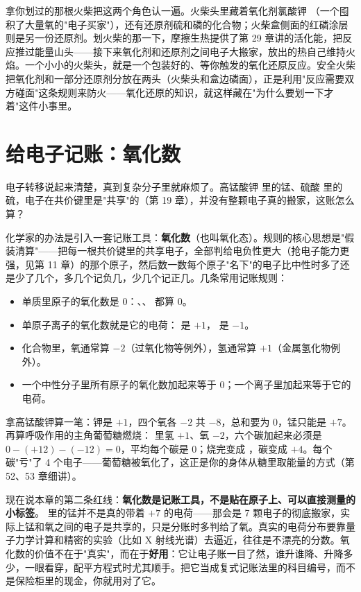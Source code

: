 拿你划过的那根火柴把这两个角色认一遍。火柴头里藏着氧化剂氯酸钾 （一个囤积了大量氧的"电子买家"），还有还原剂硫和磷的化合物；火柴盒侧面的红磷涂层则是另一份还原剂。划火柴的那一下，摩擦生热提供了第 29 章讲的活化能，把反应推过能量山头——接下来氧化剂和还原剂之间电子大搬家，放出的热自己维持火焰。一个小小的火柴头，就是一个包装好的、等你触发的氧化还原反应。安全火柴把氧化剂和一部分还原剂分放在两头（火柴头和盒边磷面），正是利用"反应需要双方碰面"这条规则来防火——氧化还原的知识，就这样藏在"为什么要划一下才着"这件小事里。

\section{给电子记账：氧化数}

电子转移说起来清楚，真到复杂分子里就麻烦了。高锰酸钾  里的锰、硫酸  里的硫，电子在共价键里是"共享"的（第 19 章），并没有整颗电子真的搬家，这账怎么算？

化学家的办法是引入一套记账工具：\textbf{氧化数}（也叫氧化态）。规则的核心思想是"假装清算"——把每一根共价键里的共享电子，全部判给电负性更大（抢电子能力更强，见第 11 章）的那个原子，然后数一数每个原子"名下"的电子比中性时多了还是少了几个，多几个记负几，少几个记正几。几条常用记账规则：

\begin{itemize}[itemsep=2pt]
\item 单质里原子的氧化数是 0：、、 都算 0。
\item 单原子离子的氧化数就是它的电荷： 是 $+1$， 是 $-1$。
\item 化合物里，氧通常算 $-2$（过氧化物等例外），氢通常算 $+1$（金属氢化物例外）。
\item 一个中性分子里所有原子的氧化数加起来等于 0；一个离子里加起来等于它的电荷。
\end{itemize}

拿高锰酸钾算一笔：钾是 $+1$，四个氧各 $-2$ 共 $-8$，总和要为 0，锰只能是 $+7$。再算呼吸作用的主角葡萄糖燃烧： 里氢 $+1$、氧 $-2$，六个碳加起来必须是 $0-(+12)-(-12)=0$，平均每个碳是 0；烧完变成 ，碳变成 $+4$。每个碳"亏"了 4 个电子——葡萄糖被氧化了，这正是你的身体从糖里取能量的方式（第 52、53 章细讲）。

现在说本章的第二条红线：\textbf{氧化数是记账工具，不是贴在原子上、可以直接测量的小标签}。 里的锰并不是真的带着 $+7$ 的电荷——那会是 7 颗电子的彻底搬家，实际上锰和氧之间的电子是共享的，只是分账时多判给了氧。真实的电荷分布要靠量子力学计算和精密的实验（比如 X 射线光谱）去逼近，往往是不漂亮的分数。氧化数的价值不在于"真实"，而在于\textbf{好用}：它让电子账一目了然，谁升谁降、升降多少，一眼看穿，配平方程式时尤其顺手。把它当成复式记账法里的科目编号，而不是保险柜里的现金，你就用对了它。

